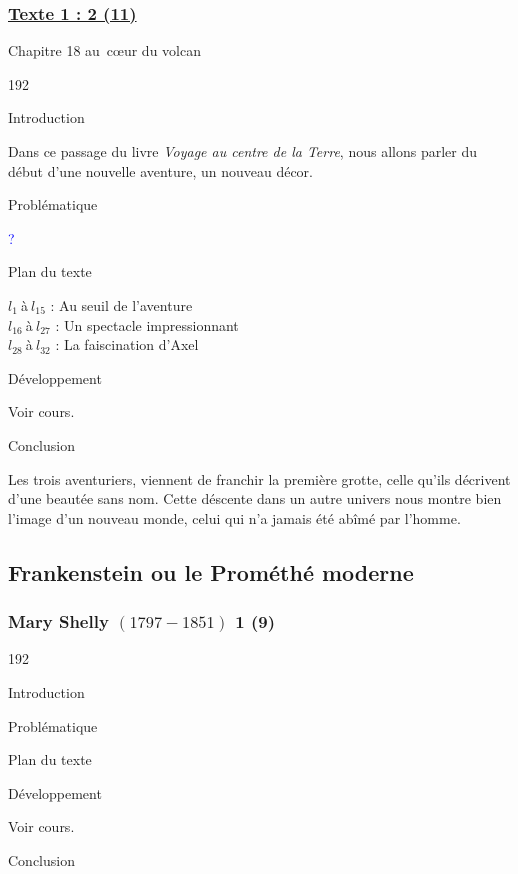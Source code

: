 \documentclass[12pt,a4paper]{article}
\begin{document}
				\subsubsection[Texte 2 (11)]{\textbf{\underline{Texte 1 : 2 (11)}}}
		Chapitre 18 au~c\oe ur du volcan
\begin{dingautolist}{192}

\item Introduction \par
Dans ce passage du livre \textit{Voyage au centre de la Terre}, nous allons parler du début d'une nouvelle aventure, un nouveau décor. 


\item Probl\'ematique \par
	\textcolor{blue}{?}
\item Plan du texte \par
	$l_{1}~$\`a$~l_{15}$ : Au seuil de l'aventure\\
    $l_{16}~$\`a$~l_{27}$ : Un spectacle impressionnant\\
    $l_{28}~$\`a$~l_{32}$ : La faiscination d'Axel

\item D\'eveloppement \par
        Voir cours.

\item Conclusion \par
Les trois aventuriers, viennent de franchir la première grotte, celle qu'ils décrivent d'une beautée sans nom. Cette déscente dans un autre univers nous montre bien l'image d'un nouveau monde, celui qui n'a jamais été abîmé par l'homme. 

\end{dingautolist}

\newpage
\subsection{Frankenstein ou le Prom\'eth\'e moderne}
				\subsubsection{Mary Shelly $(1797 - 1851) $ 1 (9)}
\begin{dingautolist}{192}

\item Introduction \par
\item Probl\'ematique \par
\item Plan du texte \par
\item D\'eveloppement \par
        Voir cours.

\item Conclusion \par

\end{dingautolist}
\end{document}
